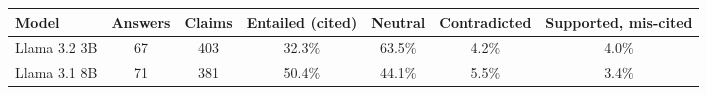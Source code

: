 \begin{tabular}{@{}lcccccc@{}}
\toprule
Model & Answers & Claims & Entailed (cited) & Neutral & Contradicted & Supported, mis-cited \\
\midrule
Llama 3.2 3B & 67 & 403 & 32.3\% & 63.5\% & 4.2\% & 4.0\% \\
Llama 3.1 8B & 71 & 381 & 50.4\% & 44.1\% & 5.5\% & 3.4\% \\
\bottomrule
\end{tabular}